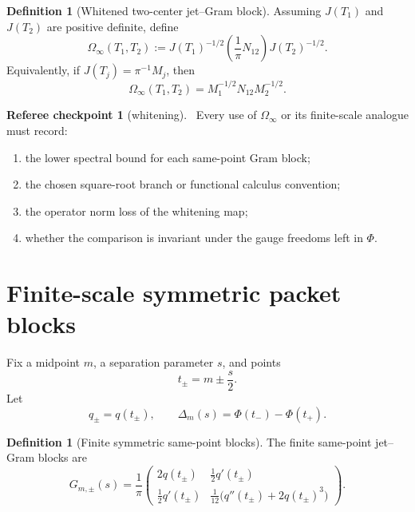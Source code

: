 \documentclass[11pt,a4paper]{amsart}
\newcommand{\Status}[1]{\textnormal{\fbox{\scriptsize\textsf{#1}}}}
\newcommand{\Core}{\Status{CORE}}
\newcommand{\Ph}{\Phi}
\theoremstyle{plain}
\theoremstyle{definition}
\newtheorem{definition}[theorem]{Definition}
\newtheorem{checkpoint}[theorem]{Referee checkpoint}
\begin{document}
\begin{definition}[Whitened two-center jet--Gram block]
\label{def:whitened-two-center-block}
Assuming \(J(T_1)\) and \(J(T_2)\) are positive definite, define
\begin{equation}
\label{eq:omega-infty}
\Omega_\infty(T_1,T_2):=J(T_1)^{-1/2}\left(\frac1\pi N_{12}\right)J(T_2)^{-1/2}.
\end{equation}
Equivalently, if \(J(T_j)=\pi^{-1}M_j\), then
\[
        \Omega_\infty(T_1,T_2)=M_1^{-1/2}N_{12}M_2^{-1/2}.
\]
\end{definition}

\begin{checkpoint}[whitening]
\label{chk:whitening}
\Core\
Every use of \(\Omega_\infty\) or its finite-scale analogue must record:
\begin{enumerate}[label=\textup{W\arabic*.},leftmargin=*]
\item the lower spectral bound for each same-point Gram block;
\item the chosen square-root branch or functional calculus convention;
\item the operator norm loss of the whitening map;
\item whether the comparison is invariant under the gauge freedoms left in \(\Ph\).
\end{enumerate}
\end{checkpoint}

\section{Finite-scale symmetric packet blocks}
\label{sec:finite-scale-packet-blocks}

Fix a midpoint \(m\), a separation parameter \(s\), and points
\begin{equation}
\label{eq:t-pm}
        t_\pm=m\pm\frac{s}{2}.
\end{equation}
Let
\[
        q_\pm=q(t_\pm),
        \qquad
        \Delta_m(s)=\Ph(t_-)-\Ph(t_+).
\]

\begin{definition}[Finite symmetric same-point blocks]
\label{def:finite-symmetric-same-blocks}
The finite same-point jet--Gram blocks are
\begin{equation}
\label{eq:Gpm}
G_{m,\pm}(s)=\frac1\pi
\begin{pmatrix}
2q(t_\pm) & \frac12 q'(t_\pm)\\[1ex]
\frac12 q'(t_\pm) & \frac1{12}\bigl(q''(t_\pm)+2q(t_\pm)^3\bigr)
\end{pmatrix}.
\end{equation}
\end{definition}
\end{document}
